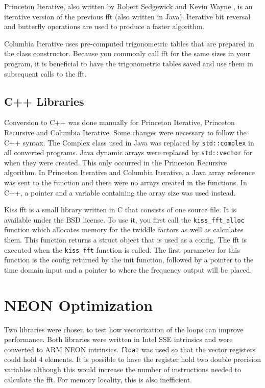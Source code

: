 Princeton Iterative, also written by Robert Sedgewick and Kevin Wayne \cite{princeton:iterative}, is an iterative version of the previous \gls{fft} (also written in Java). Iterative bit reversal and butterfly operations are used to produce a faster algorithm.

Columbia Iterative \cite{columbia:iterative} uses pre-computed trigonometric tables that are prepared in the class constructor. Because you commonly call \gls{fft} for the same sizes in your program, it is beneficial to have the trigonometric tables saved and use them in subsequent calls to the \gls{fft}.

\subsection{C++ Libraries}
Conversion to C++ was done manually for Princeton Iterative, Princeton Recursive and Columbia Iterative. Some changes were necessary to follow the C++ syntax. The Complex class used in Java was replaced by \texttt{std::complex} in all converted programs. Java dynamic arrays were replaced by \texttt{std::vector} for when they were created. This only occurred in the Princeton Recursive algorithm. In Princeton Iterative and Columbia Iterative, a Java array reference was sent to the function and there were no arrays created in the functions. In C++, a pointer and a variable containing the array size was used instead.

Kiss \gls{fft} is a small library written in C that consists of one source file. It is available under the BSD license. To use it, you first call the \texttt{kiss\_fft\_alloc} function which allocates memory for the twiddle factors as well as calculates them. This function returns a struct object that is used as a config. The \gls{fft} is executed when the \texttt{kiss\_fft} function is called. The first parameter for this function is the config returned by the init function, followed by a pointer to the time domain input and a pointer to where the frequency output will be placed.

\section{NEON Optimization}

Two libraries were chosen to test how vectorization of the loops can improve performance. Both libraries were written in Intel SSE intrinsics and were converted to ARM NEON intrinsics. \texttt{float} was used so that the vector registers could hold 4 elements. It is possible to have the register hold two double precision variables although this would increase the number of instructions needed to calculate the \gls{fft}. For memory locality, this is also inefficient.

